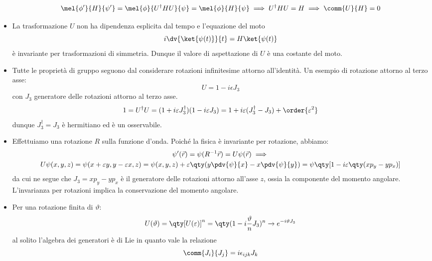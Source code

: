 \begin{itemize}
    \begin{equation*}
        \mel{\phi'}{H}{\psi'}=\mel{\phi}{U^\dag H U}{\psi}=\mel{\phi}{H}{\psi}\implies U^\dag H U=H\implies\comm{U}{H}=0
    \end{equation*}
    \item La trasformazione $U$ non ha dipendenza esplicita dal tempo e l'equazione del moto 
    \begin{equation*}
        i\dv{\ket{\psi(t)}}{t}=H\ket{\psi(t)}
    \end{equation*}
    è invariante per trasformazioni di simmetria. Dunque il valore di aspettazione di $U$ è una costante del moto.
    \item Tutte le proprietà di gruppo seguono dal considerare rotazioni infinitesime attorno all'identità. Un esempio di rotazione attorno al terzo asse:
    \begin{equation*}
        U=1-i\epsilon J_3
    \end{equation*}
    con $J_3$ generatore delle rotazioni attorno al terzo asse.
    \begin{equation*}
        1=U^\dag U=(1+i\varepsilon J_3^\dag)(1-i\varepsilon J_3)=1+i\varepsilon(J_3^\dag-J_3)+\order{\varepsilon^2}
    \end{equation*}
    dunque $J_3^\dag=J_3$ è hermitiano ed è un osservabile.
    \item Effettuiamo una rotazione $R$ sulla funzione d'onda. Poiché la fisica è invariante per rotazione, abbiamo:
    \begin{gather*}
        \psi'(\vec r)=\psi(R^{-1}\vec r)=U\psi(\vec r)\implies\\ 
        U\psi(x,y,z)=\psi(x+\varepsilon y,y-\varepsilon x,z)=\psi(x,y,z)+\varepsilon\qty(y\pdv{\psi}{x}-x\pdv{\psi}{y})=\psi\qty[1-i\varepsilon\qty(xp_y-yp_x)]
    \end{gather*}
    da cui ne segue che $J_3=xp_y-yp_x$ è il generatore delle rotazioni attorno all'asse $z$, ossia la componente del momento angolare. L'invarianza per rotazioni implica la conservazione del momento angolare.
    \item Per una rotazione finita di $\vartheta$:
    \begin{equation*}
        U(\vartheta)=\qty[U(\varepsilon)]^n=\qty(1-i\frac\vartheta n J_3)^n\to e^{-i\vartheta J_3}
    \end{equation*}
    al solito l'algebra dei generatori è di Lie in quanto vale la relazione
    \begin{equation*}
        \comm{J_i}{J_j}=i\epsilon_{ijk}J_k

\end{equation*}
\end{itemize}
